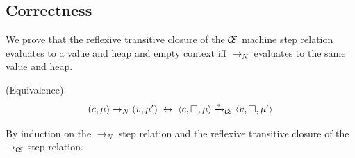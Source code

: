 \subsection{Correctness}
We prove that the reflexive transitive closure of the $\mathcal{\mathcal{C} \mskip -4mu \mathcal{E}}$ machine
step relation evaluates to a value and heap and empty context iff
$\xrightarrow{}_{N}$ evaluates to the same value and heap.

{\theorem \textnormal{(Equivalence)} $$(c, \mu) \rightarrow_{N} (v, \mu') \;
\leftrightarrow \; \langle c, \square, \mu \rangle \xrightarrow{*
}_{\mathcal{\mathcal{C} \mskip -4mu \mathcal{E}}} \langle v, \square, \mu' \rangle $$} 

By induction on the $\rightarrow_{N}$ step relation and the reflexive transitive
closure of the $\rightarrow_{\mathcal{\mathcal{C} \mskip -4mu \mathcal{E}}}$ step relation.

